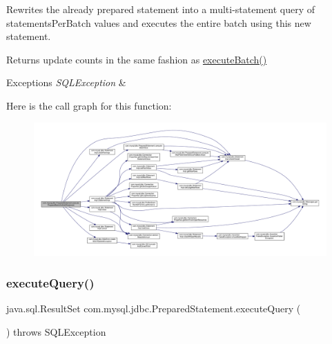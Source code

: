 Rewrites the already prepared statement into a multi-\/statement query of \textquotesingle{}statements\+Per\+Batch\textquotesingle{} values and executes the entire batch using this new statement.

\begin{DoxyReturn}{Returns}
update counts in the same fashion as \mbox{\hyperlink{classcom_1_1mysql_1_1jdbc_1_1_statement_impl_acf49c07c2b02c99e25719bb916bc0b39}{execute\+Batch()}}
\end{DoxyReturn}

\begin{DoxyExceptions}{Exceptions}
{\em S\+Q\+L\+Exception} & \\
\hline
\end{DoxyExceptions}
Here is the call graph for this function\+:
\nopagebreak
\begin{figure}[H]
\begin{center}
\leavevmode
\includegraphics[width=350pt]{classcom_1_1mysql_1_1jdbc_1_1_prepared_statement_ad3cdc3e336070c453b5878ce9ba8a0cc_cgraph}
\end{center}
\end{figure}
\mbox{\label{classcom_1_1mysql_1_1jdbc_1_1_prepared_statement_a4a9164e855e1f7848142de8973a6dab6}} 
\subsubsection{\texorpdfstring{execute\+Query()}{executeQuery()}}
{\footnotesize\ttfamily java.\+sql.\+Result\+Set com.\+mysql.\+jdbc.\+Prepared\+Statement.\+execute\+Query (\begin{DoxyParamCaption}{ }\end{DoxyParamCaption}) throws S\+Q\+L\+Exception}


